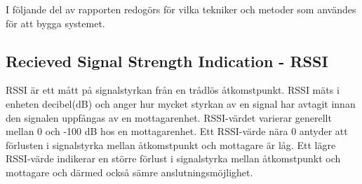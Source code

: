 \documentclass[swedish, a4paper,12pt]{article}
\begin{document}

I följande del av rapporten redogörs för vilka tekniker och metoder som användes för att bygga systemet.

\subsection{Recieved Signal Strength Indication - RSSI}\label{RSSI}
RSSI är ett mått på signalstyrkan från en trådlös åtkomstpunkt. RSSI mäts i enheten decibel(dB) och anger hur mycket styrkan av en signal har avtagit innan den signalen uppfångas av en mottagarenhet. RSSI-värdet varierar generellt mellan 0 och -100 dB hos en mottagarenhet. Ett RSSI-värde nära 0 antyder att förlusten i signalstyrka mellan åtkomstpunkt och mottagare är låg. Ett lägre RSSI-värde indikerar en större förlust i signalstyrka mellan åtkomstpunkt och mottagare och därmed också sämre anslutningsmöjlighet.
\end{document}
